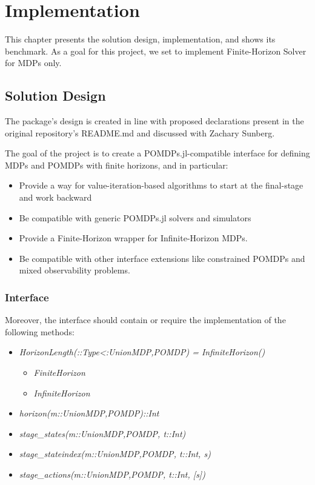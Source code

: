 \chapter{Implementation}

This chapter presents the solution design, implementation, and shows its benchmark.
As a goal for this project, we set to implement Finite-Horizon Solver for MDPs only.

\section{Solution Design}
The package's design is created in line with proposed declarations present in the original repository's README.md and discussed with Zachary Sunberg.

The goal of the project is to create a POMDPs.jl-compatible interface for defining MDPs and POMDPs with finite horizons, and in particular:
\begin{itemize}
    \item Provide a way for value-iteration-based algorithms to start at the final-stage and work backward
    \item Be compatible with generic POMDPs.jl solvers and simulators
    \item Provide a Finite-Horizon wrapper for Infinite-Horizon MDPs.
    \item Be compatible with other interface extensions like constrained POMDPs and mixed observability problems.
\end{itemize}

\subsection{Interface}
Moreover, the interface should contain or require the implementation of the following methods:
\begin{itemize}
    \item \textit{HorizonLength(::Type{<:Union{MDP,POMDP}}) = InfiniteHorizon()}
    \begin{itemize}
        \item \textit{FiniteHorizon}
        \item \textit{InfiniteHorizon}
    \end{itemize}
    \item \textit{horizon(m::Union{MDP,POMDP})::Int}
    \item \textit{stage\_states(m::Union{MDP,POMDP}, t::Int)}
    \item \textit{stage\_stateindex(m::Union{MDP,POMDP}, t::Int, s)}
    \item \textit{stage\_actions(m::Union{MDP,POMDP}, t::Int, [s])}
\end{itemize}

